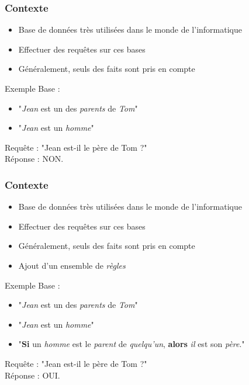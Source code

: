 
\begin{frame}
	\frametitle{Contexte}
	\begin{itemize}
		\item Base de données très utilisées dans le monde de l'informatique
		\item Effectuer des requêtes sur ces bases
		\item Généralement, seuls des faits sont pris en compte
	\end{itemize}
	\begin{exampleblock}{Exemple}
		Base :
		\begin{itemize}
			\item "{\em Jean} est un des {\em parents} de {\em Tom}"
			\item "{\em Jean} est un {\em homme}"
		\end{itemize}
		Requête : "Jean est-il le père de Tom ?"\\
		Réponse : NON.
	\end{exampleblock}
\end{frame}

\begin{frame}
	\frametitle{Contexte}
	\begin{itemize}
		\item Base de données très utilisées dans le monde de l'informatique
		\item Effectuer des requêtes sur ces bases
		\item Généralement, seuls des faits sont pris en compte
		\item Ajout d'un ensemble de {\em règles}
	\end{itemize}
	\begin{exampleblock}{Exemple}
		Base :
		\begin{itemize}
			\item "{\em Jean} est un des {\em parents} de {\em Tom}"
			\item "{\em Jean} est un {\em homme}"
			\item "{\bf Si} un {\em homme} est le {\em parent} de {\em quelqu'un}, {\bf
			alors} {\em il} est son {\em père}." 
		\end{itemize}
		Requête : "Jean est-il le père de Tom ?"\\
		Réponse : OUI.
	\end{exampleblock}
\end{frame}

